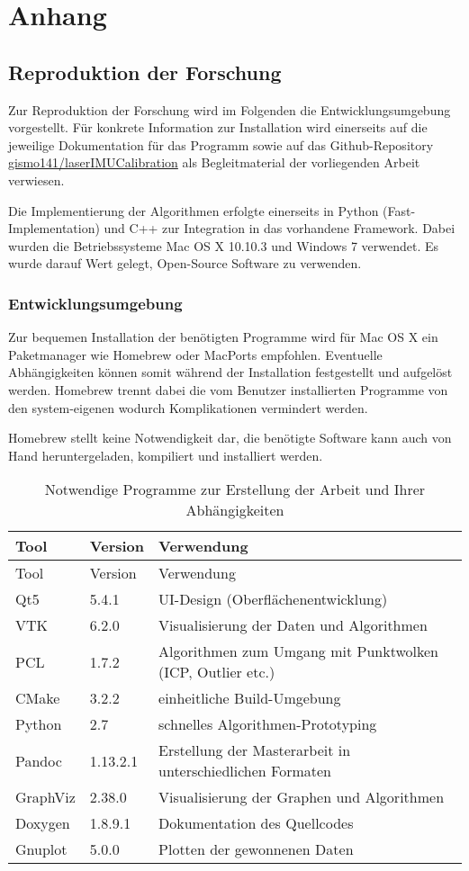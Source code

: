 \chapter{Anhang}\label{anhang}

\section{Reproduktion der Forschung}\label{reproduktion-der-forschung}

Zur Reproduktion der Forschung wird im Folgenden die
Entwicklungsumgebung vorgestellt. Für konkrete Information zur
Installation wird einerseits auf die jeweilige Dokumentation für das
Programm sowie auf das Github-Repository
\href{https://github.com/gismo141/laserIMUCalibration}{gismo141/laserIMUCalibration}
als Begleitmaterial der vorliegenden Arbeit verwiesen.

Die Implementierung der Algorithmen erfolgte einerseits in Python
(Fast-Implementation) und C++ zur Integration in das vorhandene
Framework. Dabei wurden die Betriebssysteme Mac OS X 10.10.3 und Windows
7 verwendet. Es wurde darauf Wert gelegt, Open-Source Software zu
verwenden.

\subsection{Entwicklungsumgebung}\label{entwicklungsumgebung}

Zur bequemen Installation der benötigten Programme wird für Mac OS X ein
Paketmanager wie Homebrew oder MacPorts empfohlen. Eventuelle
Abhängigkeiten können somit während der Installation festgestellt und
aufgelöst werden. Homebrew trennt dabei die vom Benutzer installierten
Programme von den system-eigenen wodurch Komplikationen vermindert
werden.

Homebrew stellt keine Notwendigkeit dar, die benötigte Software kann
auch von Hand heruntergeladen, kompiliert und installiert werden.

\begin{longtable}[c]{@{}lll@{}}
\caption{Notwendige Programme zur Erstellung der Arbeit und Ihrer
Abhängigkeiten}\tabularnewline
\toprule
Tool & Version & Verwendung\tabularnewline
\midrule
\endfirsthead
\toprule
Tool & Version & Verwendung\tabularnewline
\midrule
\endhead
Qt5 & 5.4.1 & UI-Design (Oberflächenentwicklung)\tabularnewline
VTK & 6.2.0 & Visualisierung der Daten und Algorithmen\tabularnewline
PCL & 1.7.2 & Algorithmen zum Umgang mit Punktwolken (ICP, Outlier
etc.)\tabularnewline
CMake & 3.2.2 & einheitliche Build-Umgebung\tabularnewline
Python & 2.7 & schnelles Algorithmen-Prototyping\tabularnewline
Pandoc & 1.13.2.1 & Erstellung der Masterarbeit in unterschiedlichen
Formaten\tabularnewline
GraphViz & 2.38.0 & Visualisierung der Graphen und
Algorithmen\tabularnewline
Doxygen & 1.8.9.1 & Dokumentation des Quellcodes\tabularnewline
Gnuplot & 5.0.0 & Plotten der gewonnenen Daten\tabularnewline
\bottomrule
\end{longtable}

